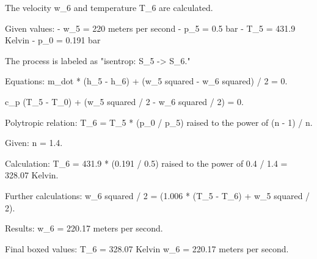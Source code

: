 The velocity w_6 and temperature T_6 are calculated.  

Given values:  
- w_5 = 220 meters per second  
- p_5 = 0.5 bar  
- T_5 = 431.9 Kelvin  
- p_0 = 0.191 bar  

The process is labeled as "isentrop: S_5 -> S_6."  

Equations:  
m_dot * (h_5 - h_6) + (w_5 squared - w_6 squared) / 2 = 0.  

c_p (T_5 - T_0) + (w_5 squared / 2 - w_6 squared / 2) = 0.  

Polytropic relation:  
T_6 = T_5 * (p_0 / p_5) raised to the power of (n - 1) / n.  

Given:  
n = 1.4.  

Calculation:  
T_6 = 431.9 * (0.191 / 0.5) raised to the power of 0.4 / 1.4 = 328.07 Kelvin.  

Further calculations:  
w_6 squared / 2 = (1.006 * (T_5 - T_6) + w_5 squared / 2).  

Results:  
w_6 = 220.17 meters per second.  

Final boxed values:  
T_6 = 328.07 Kelvin  
w_6 = 220.17 meters per second.